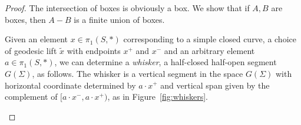 \begin{proof}
The intersection of boxes is obviously a box.
We show that if $A,B$ are boxes, then $A - B$ is a finite union of boxes.

Given an element $x \in \pi_1(S,*)$ corresponding to a simple closed curve, a choice of geodesic lift $\tilde{x}$ with endpoints $x^{+}$ and $x^{-}$ and an arbitrary element $a \in \pi_1(S,*)$, we can determine a \emph{whisker}, a half-closed half-open segment $G(\Sigma)$, as follows. The whisker is a vertical segment in the space $G(\Sigma)$ with horizontal coordinate determined by $a \cdot x^{+}$ and vertical span given by the complement of $[a \cdot x^{-},a \cdot x^{+})$, as in Figure~\ref{fig:whiskers}.

\begin{figure}
\end{figure}

\begin{figure}
\end{figure}


\end{proof}

